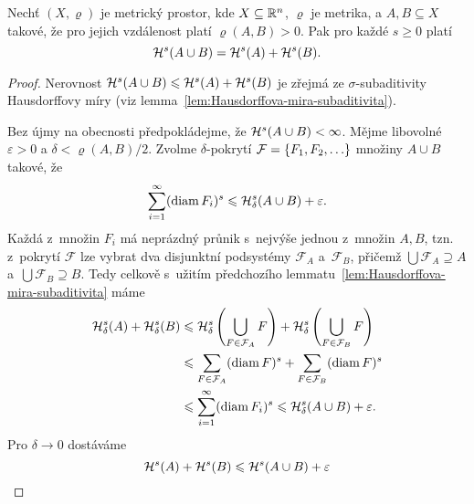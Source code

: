 \begin{lemma}\label{lem:hausdorffova-mira-sigma-aditivita-kladna-vzdalenost}
    Nechť $(X,\varrho)$ je metrický prostor, kde $X\subseteq\mathbb{R}^n$, $\varrho$ je metrika, a $A,B\subseteq X$ takové, že pro jejich vzdálenost platí $\varrho(A,B)>0$. Pak pro každé $s\geqslant 0$ platí
    \[\mathcal{H}^{s}(A\cup B)=\mathcal{H}^{s}(A)+\mathcal{H}^{s}(B).\]
\end{lemma}
\begin{proof}
    Nerovnost $\mathcal{H}^{s}(A\cup B)\leqslant\mathcal{H}^{s}(A)+\mathcal{H}^{s}(B)$ je zřejmá ze $\sigma$-subaditivity Hausdorffovy míry (viz lemma~\ref{lem:Hausdorffova-mira-subaditivita}).

    Bez újmy na obecnosti předpokládejme, že $\mathcal{H}^{s}(A\cup B)<\infty$. Mějme libovolné $\varepsilon>0$ a $\delta<\varrho(A,B)/2$. Zvolme $\delta$-pokrytí $\mathcal{F}=\left\{F_1,F_2,\ldots\right\}$ množiny $A\cup B$ takové, že
    \[\sum_{i=1}^{\infty}(\operatorname{diam}{F_i})^s\leqslant\mathcal{H}_{\delta}^{s}(A\cup B)+\varepsilon.\]
    Každá z~množin $F_i$ má neprázdný průnik s~nejvýše jednou z~množin $A,B$, tzn. z~pokrytí $\mathcal{F}$ lze vybrat dva disjunktní podsystémy $\mathcal{F}_A$ a~$\mathcal{F}_B$, přičemž $\bigcup\mathcal{F}_A\supseteq A$ a~$\bigcup\mathcal{F}_B\supseteq B$. Tedy celkově s~užitím předchozího lemmatu~\ref{lem:Hausdorffova-mira-subaditivita} máme
    \begin{align*}
        \mathcal{H}_{\delta}^{s}(A)+\mathcal{H}_{\delta}^{s}(B)&\leqslant\mathcal{H}_{\delta}^{s}\left(\bigcup_{F\in\mathcal{F}_A}F\right)+\mathcal{H}_{\delta}^{s}\left(\bigcup_{F\in\mathcal{F}_B}F\right)\\
        &\leqslant\sum_{F\in\mathcal{F}_A}(\operatorname{diam}{F})^s+\sum_{F\in\mathcal{F}_B}(\operatorname{diam}{F})^s\\
        &\leqslant\sum_{i=1}^{\infty}(\operatorname{diam}{F_i})^s\leqslant\mathcal{H}_{\delta}^{s}(A\cup B)+\varepsilon.
    \end{align*}
    Pro $\delta\to 0$ dostáváme
    \[\mathcal{H}^{s}(A)+\mathcal{H}^{s}(B)\leqslant\mathcal{H}^{s}(A\cup B)+\varepsilon\]
\end{proof}

